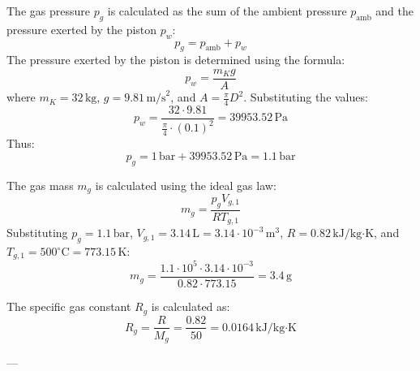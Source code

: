 The gas pressure \( p_g \) is calculated as the sum of the ambient pressure \( p_{\text{amb}} \) and the pressure exerted by the piston \( p_w \):  
\[
p_g = p_{\text{amb}} + p_w
\]  
The pressure exerted by the piston is determined using the formula:  
\[
p_w = \frac{m_K g}{A}
\]  
where \( m_K = 32 \, \text{kg} \), \( g = 9.81 \, \text{m/s}^2 \), and \( A = \frac{\pi}{4} D^2 \). Substituting the values:  
\[
p_w = \frac{32 \cdot 9.81}{\frac{\pi}{4} \cdot (0.1)^2} = 39953.52 \, \text{Pa}
\]  
Thus:  
\[
p_g = 1 \, \text{bar} + 39953.52 \, \text{Pa} = 1.1 \, \text{bar}
\]  

The gas mass \( m_g \) is calculated using the ideal gas law:  
\[
m_g = \frac{p_g V_{g,1}}{R T_{g,1}}
\]  
Substituting \( p_g = 1.1 \, \text{bar} \), \( V_{g,1} = 3.14 \, \text{L} = 3.14 \cdot 10^{-3} \, \text{m}^3 \), \( R = 0.82 \, \text{kJ/kg·K} \), and \( T_{g,1} = 500^\circ\text{C} = 773.15 \, \text{K} \):  
\[
m_g = \frac{1.1 \cdot 10^5 \cdot 3.14 \cdot 10^{-3}}{0.82 \cdot 773.15} = 3.4 \, \text{g}
\]  

The specific gas constant \( R_g \) is calculated as:  
\[
R_g = \frac{R}{M_g} = \frac{0.82}{50} = 0.0164 \, \text{kJ/kg·K}
\]  

---
